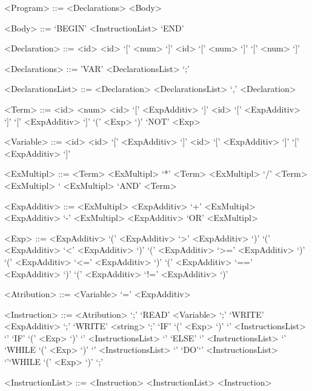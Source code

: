 \begin{grammar}

<Program> ::= <Declarations> <Body> 

<Body> ::= `BEGIN' <InstructionList> `END'

<Declaration> ::= <id>
\alt <id> `[' <num> `]'
\alt <id> `[' <num> `]' `[' <num> `]' 

<Declarations> ::= 'VAR' <DeclarationsList> `;' 

<DeclarationsList> ::= <Declaration> 
\alt <DeclarationsList> `,' <Declaration> 

<Term> ::= <id>
\alt <num>
\alt <id> `[' <ExpAdditiv> `]'
\alt <id> `[' <ExpAdditiv> `]' `[' <ExpAdditiv> `]'
\alt `(' <Exp> `)'
\alt `NOT' <Exp>

<Variable> ::= <id>
\alt <id> `[' <ExpAdditiv> `]'
\alt <id> `[' <ExpAdditiv> `]' `[' <ExpAdditiv> `]' 
 
<ExMultipl> ::= <Term>
\alt <ExMultipl> `*'  <Term>
\alt <ExMultipl> `/' <Term>
\alt <ExMultipl> `%
\alt <ExMultipl> `AND' <Term>

<ExpAdditiv> ::= <ExMultipl> 
\alt <ExpAdditiv> `+' <ExMultipl>
\alt <ExpAdditiv> `-' <ExMultipl> 
\alt <ExpAdditiv> `OR' <ExMultipl> 


<Exp> ::= <ExpAdditiv>             
\alt `(' <ExpAdditiv> `>'  <ExpAdditiv> `)'
\alt `(' <ExpAdditiv> `<'  <ExpAdditiv> `)'
\alt `(' <ExpAdditiv> `>=' <ExpAdditiv> `)'
\alt `(' <ExpAdditiv> `<=' <ExpAdditiv> `)'
\alt `(' <ExpAdditiv> `==' <ExpAdditiv> `)'
\alt `(' <ExpAdditiv> `!=' <ExpAdditiv> `)'



<Atribution> ::=  <Variable> `=' <ExpAdditiv> 

<Instruction> ::= <Atribution> `;' 
\alt `READ'  <Variable> `;'
\alt `WRITE' <ExpAdditiv> `;'                      
\alt `WRITE' <string> `;'
\alt `IF' `(' <Exp> `)' `{' <InstructionsList> `}' 
\alt `IF' `(' <Exp> `)' `{' <InstructionsList> `}' `ELSE' `{' <InstructionsList> `}' 
\alt `WHILE `(' <Exp> `)' `{' <InstructionsList> `}' 
\alt `DO'`{' <InstructionsList> `}'`WHILE `(' <Exp> `)' `;' 

<InstructionList> ::= <Instruction>
\alt <InstructionList> <Instruction>  

\end{grammar}
